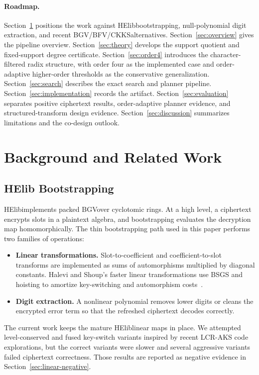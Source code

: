\documentclass[a4paper,runningheads]{llncs}
\newcommand{\HElib}{\textsf{HElib}}
\newcommand{\BGV}{\textsf{BGV}}
\newcommand{\BFV}{\textsf{BFV}}
\newcommand{\CKKS}{\textsf{CKKS}}
\begin{document}
\paragraph{Roadmap.}
Section~\ref{sec:related} positions the work against \HElib bootstrapping, null-polynomial digit extraction, and recent \BGV/\BFV/\CKKS alternatives. Section~\ref{sec:overview} gives the pipeline overview. Section~\ref{sec:theory} develops the support quotient and fixed-support degree certificate. Section~\ref{sec:order4} introduces the character-filtered radix structure, with order four as the implemented case and order-adaptive higher-order thresholds as the conservative generalization. Section~\ref{sec:search} describes the exact search and planner pipeline. Section~\ref{sec:implementation} records the artifact. Section~\ref{sec:evaluation} separates positive ciphertext results, order-adaptive planner evidence, and structured-transform design evidence. Section~\ref{sec:discussion} summarizes limitations and the co-design outlook.

\section{Background and Related Work}
\label{sec:related}

\subsection{HElib Bootstrapping}

\HElib implements packed \BGV over cyclotomic rings.  At a high level, a
ciphertext encrypts slots in a plaintext algebra, and bootstrapping evaluates
the decryption map homomorphically.  The thin bootstrapping path used in this
paper performs two families of operations:
\begin{itemize}[leftmargin=*]
  \item \textbf{Linear transformations.}  Slot-to-coefficient and
  coefficient-to-slot transforms are implemented as sums of automorphisms
  multiplied by diagonal constants.  Halevi and Shoup's faster linear
  transformations use BSGS and hoisting to amortize key-switching and
  automorphism costs~\cite{halevi_shoup_linear_transforms}.
  \item \textbf{Digit extraction.}  A nonlinear polynomial removes lower
  digits or cleans the encrypted error term so that the refreshed ciphertext
  decodes correctly.
\end{itemize}
The current work keeps the mature \HElib linear maps in place.  We attempted
level-conserved and fused key-switch variants inspired by recent LCR-AKS code
explorations, but the correct variants were slower and several aggressive
variants failed ciphertext correctness.  Those results are reported as
negative evidence in Section~\ref{sec:linear-negative}.
\end{document}
